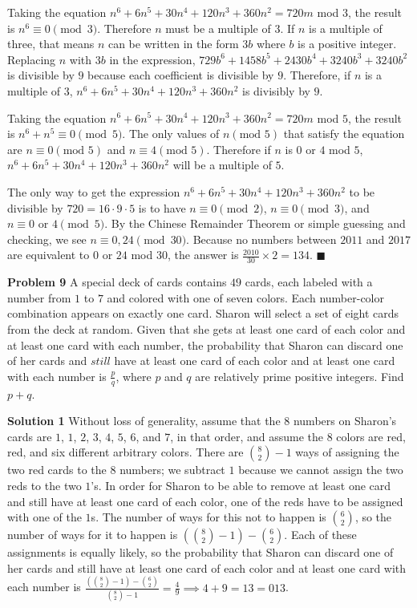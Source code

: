 \documentclass[a4paper,11pt]{article}
\begin{document}
Taking the equation $n^6+6n^5+30n^4+120n^3+360n^2=720m$ mod $3$, the result is $n^6 \equiv 0 \pmod{3}$. Therefore $n$ must be a multiple of $3$. If $n$ is a multiple of three, that means $n$ can be written in the form $3b$ where $b$ is a positive integer. Replacing $n$ with $3b$ in the expression, $729b^6+1458b^5+2430b^4+3240b^3+3240b^2$ is divisible by $9$ because each coefficient is divisible by $9$. Therefore, if $n$ is a multiple of $3$, $n^6+6n^5+30n^4+120n^3+360n^2$ is divisibly by $9$.

Taking the equation $n^6+6n^5+30n^4+120n^3+360n^2=720m$ mod $5$, the result is $n^6+n^5 \equiv 0 \pmod{5}$. The only values of $n (\text{mod }5)$ that satisfy the equation are $n\equiv0(\text{mod }5)$ and $n\equiv4(\text{mod }5)$. Therefore if $n$ is $0$ or $4$ mod $5$, $n^6+6n^5+30n^4+120n^3+360n^2$ will be a multiple of $5$.

The only way to get the expression $n^6+6n^5+30n^4+120n^3+360n^2$ to be divisible by $720=16 \cdot 9 \cdot 5$ is to have $n \equiv 0 \pmod{2}$, $n \equiv 0 \pmod{3}$, and $n \equiv 0 \text{ or } 4 \pmod{5}$. By the Chinese Remainder Theorem or simple guessing and checking, we see $n\equiv0,24 \pmod{30}$. Because no numbers between $2011$ and $2017$ are equivalent to $0$ or $24$ mod $30$, the answer is $\frac{2010}{30}\times2=\boxed{134}$. \hfill $\blacksquare$

\textbf{Problem 9}
A special deck of cards contains $49$ cards, each labeled with a number from $1$ to $7$ and colored with one of seven colors. Each number-color combination appears on exactly one card. Sharon will select a set of eight cards from the deck at random. Given that she gets at least one card of each color and at least one card with each number, the probability that Sharon can discard one of her cards and $\textit{still}$ have at least one card of each color and at least one card with each number is $\frac{p}{q}$, where $p$ and $q$ are relatively prime positive integers. Find $p+q$.

\textbf{Solution 1}
Without loss of generality, assume that the $8$ numbers on Sharon's cards are $1$, $1$, $2$, $3$, $4$, $5$, $6$, and $7$, in that order, and assume the $8$ colors are red, red, and six different arbitrary colors. There are ${8\choose2}-1$ ways of assigning the two red cards to the $8$ numbers; we subtract $1$ because we cannot assign the two reds to the two $1$'s. In order for Sharon to be able to remove at least one card and still have at least one card of each color, one of the reds have to be assigned with one of the $1$s. The number of ways for this not to happen is ${6\choose2}$, so the number of ways for it to happen is $\left({8\choose2}-1\right)-{6\choose2}$. Each of these assignments is equally likely, so the probability that Sharon can discard one of her cards and still have at least one card of each color and at least one card with each number is $\frac{\left({8\choose2}-1\right)-{6\choose2}}{{8\choose2}-1}=\frac{4}{9} \implies 4 + 9 = 13 = \boxed{013}$.
\end{document}
